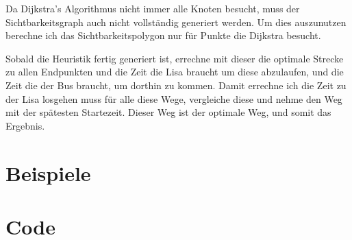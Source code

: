 \documentclass[12pt]{article}
\begin{document}
Da Dijkstra's Algorithmus nicht immer alle Knoten besucht, muss der Sichtbarkeitsgraph auch nicht vollständig generiert werden. Um dies auszunutzen berechne ich das Sichtbarkeitspolygon nur für Punkte die Dijkstra besucht.

Sobald die Heuristik fertig generiert ist, errechne mit dieser die optimale Strecke zu allen Endpunkten und die Zeit die Lisa braucht um diese abzulaufen, und die Zeit die der Bus braucht, um dorthin zu kommen. Damit errechne ich die Zeit zu der Lisa losgehen muss für alle diese Wege, vergleiche diese und nehme den Weg mit der spätesten Startezeit. Dieser Weg ist der optimale Weg, und somit das Ergebnis.

\section{Beispiele}

\section{Code}
\end{document}
